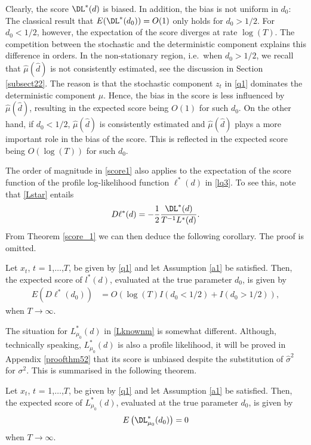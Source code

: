 {{Clearly, the score $\DL^*(d)$ is biased. In addition, the bias is not uniform in $d_0$: The classical result that $E( \DL^*(d_0) ) = O(1)$ only holds for $d_0 > 1/2$. For $d_0 < 1/2$, however, the expectation of the score
diverges at rate $\log(T)$. The competition between the stochastic and the deterministic component explains this difference in orders. In the non-stationary region, i.e.\ when $d_0 > 1/2$, we recall that $\hat{\mu}(\hat{d})$ is
not consistently estimated, see the discussion in Section \ref{subsect22}. The reason is that the stochastic component $z_t$ in \eqref{q1} dominates the deterministic component $\mu$. Hence, the bias in the score is less
influenced by $\hat{\mu}(\hat{d})$, resulting in the expected score being $O(1)$ for such $d_0$. On the other hand, if $d_0 < 1/2$, $\hat{\mu}(\hat{d})$ is consistently estimated and $\hat{\mu}(\hat{d})$ plays a more important
role in the bias of the score. This is reflected in the expected score being $O(\log(T))$ for such $d_0$.



The order of magnitude in \eqref{score1} also applies to the expectation of the score function of the profile log-likelihood function $\ell^*(d)$ in \eqref{lq3}. To see this, note that \eqref{Lstar} entails
\begin{align}
    D\ell^*(d) = - \frac{1}{2}\frac{\DL^*(d)}{T^{-1} L^*(d)}. \label{zzeta}
\end{align}
From Theorem \ref{score_1} we can then deduce the following corollary. The proof is omitted. 
\begin{corollary} \label{corr21}
Let $x_t$, $t$ = 1,$\ldots$,$T$, be given by \eqref{q1} and let Assumption \ref{a1} be satisfied. Then, the expected score of $l^* (d)$, evaluated at the true parameter $d_0$, is given by
\begin{align*}
        E \left( D\ell^*(d_0) \right)  &= O( \log(T)I(d_0 < 1/2) + I(d_0 > 1/2) ),
\end{align*}
when $T \rightarrow \infty$.
\end{corollary}



The situation for $L_{\mu_0}^*(d)$ in \eqref{Lknownm} is somewhat different. Although, technically speaking, $L_{\mu_0}^*(d)$ is also a profile likelihood, it will be proved in Appendix \ref{proofthm52} that its score is unbiased despite the substitution of  $\hat{\sigma}^2$ for $\sigma^2$. This is summarised in the following theorem.
\begin{theorem}\label{score_2} 
Let $x_t$, $t$ = 1,$\ldots$,$T$, be given by \eqref{q1} and let Assumption \ref{a1} be satisfied. Then, the expected score of $L^*_{\mu_0} (d)$, evaluated at the true parameter $d_0$, is given by
\begin{align}
     E\left( \DL_{\mu_0}^*(d_0) \right) = 0 \label{score2}
\end{align}
when $T \rightarrow \infty$.
\end{theorem}




}}
